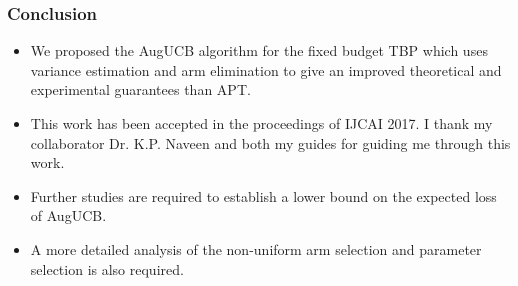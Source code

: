 \begin{frame}
\frametitle{Conclusion}
\begin{itemize}
\item<1-> We proposed the AugUCB algorithm for the fixed budget TBP  which uses variance estimation and arm elimination to give an improved theoretical and experimental guarantees than APT.
\item<1-> This work has been accepted in the proceedings of IJCAI 2017. I thank my collaborator Dr. K.P. Naveen and both my guides for guiding me through this work.
\item<2-> Further studies are required to establish a lower bound on the expected loss of AugUCB.
\item<3-> A more detailed analysis of the non-uniform arm selection and parameter selection is also required.
\end{itemize}
\end{frame}


%
